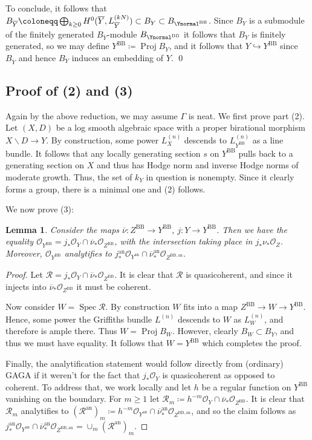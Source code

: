 \documentclass{amsart}
\newcommand{\bs}{\backslash}
\newcommand{\proj}{\operatorname{Proj}}
\newcommand{\Spec}{\operatorname{Spec}}
\newcommand{\an}{\operatorname{an}}
\newcommand{\ol}{\overline}
\newtheorem{lem}[theorem]{Lemma}
\theoremstyle{definition}
\theoremstyle{remark}
\def\cO{\mathcal{O}}
\def\Spec{\operatorname{Spec}}
\def\an{\mathrm{an}}
\def\BB{\mathrm{BB}}
\renewcommand{\bar}[1]{\ol{#1}}
\numberwithin{equation}{section}
\begin{document}
To conclude, it follows that $B_{\ol{Y}}\coloneqq  \bigoplus_{k\geq 0} H^0(\ol{Y},L^{(kN)}_{\ol{Y}})\subset B_Y\subset B_{\Ynormal^{\BB}}$. Since $B_Y$ is a submodule of the finitely generated $B_{\ol{Y}}$-module $B_{\Ynormal^{\BB}}$ it follows that $B_Y$ is finitely generated, so we may define $Y^{\BB}\coloneqq  \proj B_Y$, and it follows that $Y\hookrightarrow Y^{\BB}$ since $B_{\ol{Y}}$ and hence $B_Y$ induces an embedding of $Y$.
\qed

\subsection{Proof of  (2) and (3)}

Again by the above reduction, we may assume $\Gamma$ is neat.  We first prove part (2). Let $(X,D)$ be a log smooth algebraic space with a proper birational morphism $X\bs D\to Y$. By construction, some power $L_{X}^{(n)}$ descends to $L_{Y^{\BB}}^{(n)}$ as a line bundle. It follows that any locally generating section $s$ on $Y^{\BB}$ pulls back to a generating section on $X$ and thus has Hodge norm and inverse Hodge norms of moderate growth. Thus, the set of $k_Y$ in question is nonempty. Since it clearly forms a group, there is a minimal one and (2) follows.

We now prove (3):

\begin{lem}\label{lem:YBBfromnorm}
Consider the maps $\bar\nu:Z^{\BB}\to Y^{\BB}$, $j:Y\to Y^{\BB}$. Then we have the equality $\cO_{Y^{\BB}}=j_*\cO_Y\cap \bar\nu_*\cO_{Z^{\BB}}$, with the intersection taking place in $j_*\nu_*\cO_Z$. 
Moreover, $\cO_{Y^\BB}$ analytifies to $j^\an_*\cO_{Y^{\an}}\cap \bar\nu^{\an}_*\cO_{Z^{\BB,\an}}.$
\end{lem}

\begin{proof}
    Let $\mathcal{R}=j_*\cO_Y\cap \bar\nu_*\cO_{Z^{\BB}}$. It is clear that $\mathcal{R}$ is quasicoherent, and since it injects into $\bar\nu_*\cO_{Z^{\BB}}$ it must be coherent.

    Now consider $W=\Spec \mathcal{R}$. By construction $W$ fits into a map $Z^{\BB}\to W\to Y^\BB$. Hence, some power the Griffiths bundle $L^{(n)}$ descends to $W$ as $L^{(n)}_W$, and therefore is ample there. Thus $W=\proj B_W$. However, clearly $B_W\subset B_Y$, and thus we must have equality. It follows that $W=Y^{\BB}$ which completes the proof.

    Finally, the analytification statement would follow directly from (ordinary) GAGA if it weren't for the fact that $j_*\cO_Y$ is quasicoherent as opposed to coherent. To address that, we work locally and let $h$ be a regular function on $Y^{\BB}$ vanishing on the boundary. For $m\geq 1$ let $\mathcal{R}_m\coloneqq  h^{-m}\cO_Y\cap \bar\nu_*\cO_{Z^{\BB}}$. It is clear that $\mathcal{R}_m$ analytifies to $(\mathcal{R}^{\an})_m\coloneqq  h^{-m}\cO_{Y^{\an}}\cap \bar\nu^{\an}_*\cO_{Z^{\BB,\an}}$, and so the claim follows as $j^\an_*\cO_{Y^{\an}}\cap \bar\nu^{\an}_*\cO_{Z^{\BB,\an}}=\cup_m (\mathcal{R}^{\an})_m$. 
\end{proof}
\end{document}
